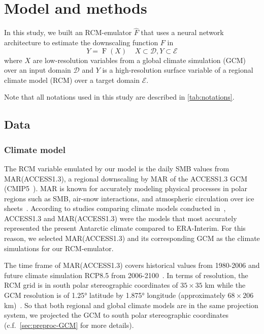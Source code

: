\documentclass[a4paper,11pt,oneside]{report}
\begin{document}




\chapter{Model and methods}

In this study, we built an RCM-emulator $\hat{F}$ that uses a neural network architecture to estimate the downscaling function $F$ in 
\begin{equation}\label{eq:emulator-equation}
    Y = \operatorname{F}(X) \;\;\;\; X\subset\mathcal{D}, Y\subset\mathcal{E}
    \end{equation}
where $X$ are low-resolution variables from a global climate simulation (GCM) over an input domain $\mathcal{D}$ and $Y$ is a high-resolution surface variable of a regional climate model (RCM) over a target domain $\mathcal{E}$. 

Note that all notations used in this study are described in \autoref{tab:notations}. 


\section{Data}\label{sec:data}
\subsection{Climate model}
The RCM variable emulated by our model is the daily SMB values from MAR(ACCESS1.3), a regional downscaling by MAR of the ACCESS1.3 GCM (CMIP5~\cite{ACCESS13, CMIP5}). MAR is known for accurately modeling physical processes in polar regions such as SMB, air-snow interactions, and atmospheric circulation over ice sheets~\cite{MAR}. According to studies comparing climate models conducted in~\cite{Kittel, Agosta2015}, ACCESS1.3 and MAR(ACCESS1.3) were the models that most accurately represented the present Antarctic climate compared to ERA-Interim. For this reason, we selected MAR(ACCESS1.3) and its corresponding GCM as the climate simulations for our RCM-emulator. 

The time frame of MAR(ACCESS1.3) covers historical values from 1980-2006 and future climate simulation RCP8.5 from 2006-2100~\cite{Moss2010}. In terms of resolution, the RCM grid is in south polar stereographic coordinates of $35 \times 35$ \si{km} while the GCM resolution is of 1.25° latitude by 1.875° longitude (approximately $68 \times 206$ \si{km})~\cite{ACCESS13, ACCESS13_2}. So that both regional and global climate models are in the same projection system, we projected the GCM to south polar stereographic coordinates (c.f.~\autoref{sec:preproc-GCM} for more details). 
\end{document}
